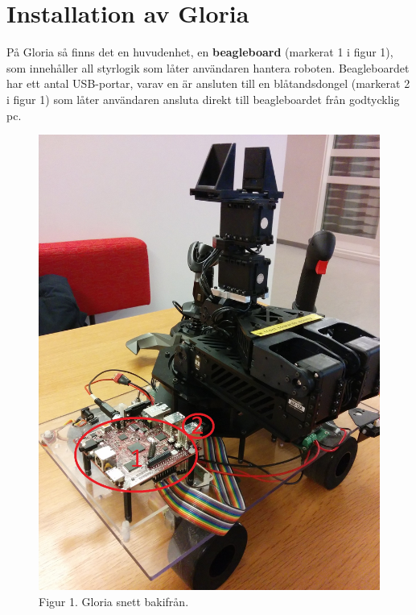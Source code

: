 \section{Installation av Gloria}
På Gloria så finns det en huvudenhet, en \textbf{beagleboard} (markerat 1 i figur 1), som innehåller all styrlogik som låter användaren hantera roboten. Beagleboardet har ett antal USB-portar, varav en är ansluten till en blåtandsdongel (markerat 2 i figur 1) som låter användaren ansluta direkt till beagleboardet från godtycklig pc.

\begin{figure}[h!]
	\center
	\includegraphics[scale=0.2]{GloriaAnvh.jpg}
	\endcenter
	\caption{Figur 1. Gloria snett bakifrån.}
\end{figure}

